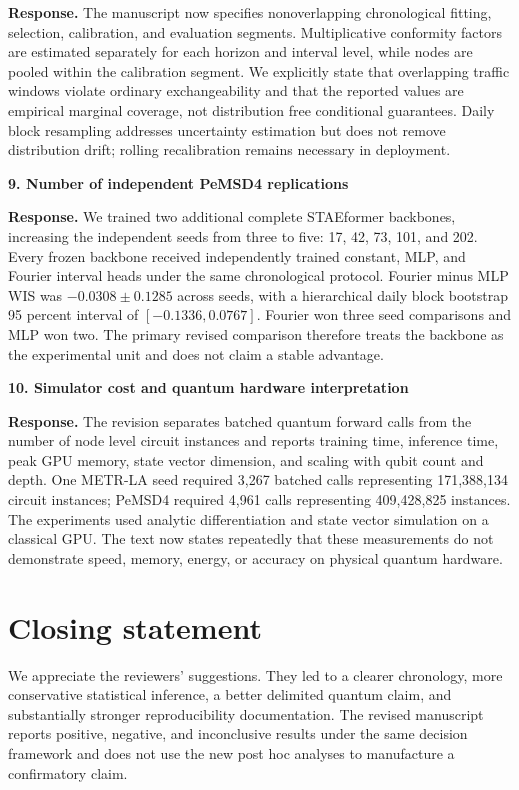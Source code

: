 \documentclass[11pt]{article}
\newcommand{\response}[1]{\textbf{Response.} #1}
\begin{document}
\response{The manuscript now specifies nonoverlapping chronological fitting, selection, calibration, and evaluation segments. Multiplicative conformity factors are estimated separately for each horizon and interval level, while nodes are pooled within the calibration segment. We explicitly state that overlapping traffic windows violate ordinary exchangeability and that the reported values are empirical marginal coverage, not distribution free conditional guarantees. Daily block resampling addresses uncertainty estimation but does not remove distribution drift; rolling recalibration remains necessary in deployment.}

\textbf{9. Number of independent PeMSD4 replications}

\response{We trained two additional complete STAEformer backbones, increasing the independent seeds from three to five: 17, 42, 73, 101, and 202. Every frozen backbone received independently trained constant, MLP, and Fourier interval heads under the same chronological protocol. Fourier minus MLP WIS was $-0.0308\pm0.1285$ across seeds, with a hierarchical daily block bootstrap 95 percent interval of $[-0.1336,0.0767]$. Fourier won three seed comparisons and MLP won two. The primary revised comparison therefore treats the backbone as the experimental unit and does not claim a stable advantage.}

\textbf{10. Simulator cost and quantum hardware interpretation}

\response{The revision separates batched quantum forward calls from the number of node level circuit instances and reports training time, inference time, peak GPU memory, state vector dimension, and scaling with qubit count and depth. One METR-LA seed required 3,267 batched calls representing 171,388,134 circuit instances; PeMSD4 required 4,961 calls representing 409,428,825 instances. The experiments used analytic differentiation and state vector simulation on a classical GPU. The text now states repeatedly that these measurements do not demonstrate speed, memory, energy, or accuracy on physical quantum hardware.}

\section*{Closing statement}

We appreciate the reviewers' suggestions. They led to a clearer chronology, more conservative statistical inference, a better delimited quantum claim, and substantially stronger reproducibility documentation. The revised manuscript reports positive, negative, and inconclusive results under the same decision framework and does not use the new post hoc analyses to manufacture a confirmatory claim.
\end{document}
